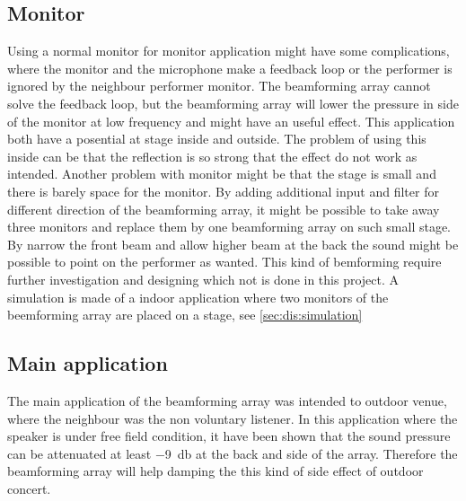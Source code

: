 \subsection{Monitor}
Using a normal monitor for monitor application might have some complications, where the monitor and the microphone make a feedback loop or the performer is ignored by the neighbour performer monitor. The beamforming array cannot solve the feedback loop, but the beamforming array will lower the pressure in side of the monitor at low frequency and might have an useful effect. This application both have a posential at stage inside and outside. The problem of using this inside can be that the reflection is so strong that the effect do not work as intended. Another problem with monitor might be that the stage is small and there is barely space for the monitor. By adding additional input and filter for different direction of the beamforming array, it might be possible to take away three monitors and replace them by one beamforming array on such small stage. By narrow the front beam and allow higher beam at the back the sound might be possible to point on the performer as wanted. This kind of bemforming require further investigation and designing which not is done in this project. A simulation is made of a indoor application where two monitors of the beemforming array are placed on a stage, see \autoref{sec:dis:simulation}



\subsection{Main application}
The main application of the beamforming array was intended to outdoor venue, where the neighbour was the non voluntary listener. In this application where the speaker is under free field condition, it have been shown that the sound pressure can be attenuated at least \SI{-9}{\decibel} at the back and side of the array. Therefore the beamforming array will help damping the this kind of side effect of outdoor concert.


